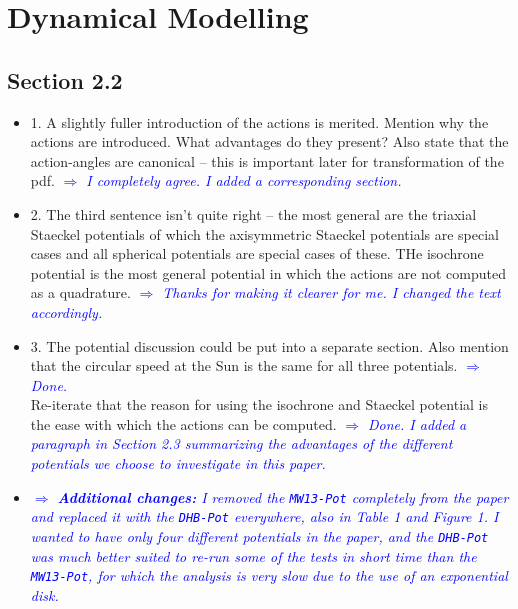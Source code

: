 \documentclass[10pt,a4paper]{article}
\newcommand{\Comment}[1]{\textsl{\textcolor{Blue}{$\Longrightarrow$ {#1}}}}
\begin{document}
\section{Dynamical Modelling}

\subsection{Section 2.2}
\begin{itemize}
\item 1. A slightly fuller introduction of the actions is merited. Mention why the actions are introduced. What advantages do they present? Also state that the action-angles are canonical -- this is important later for transformation of the pdf. \Comment{I completely agree. I added a corresponding section.}
\item 2. The third sentence isn't quite right -- the most general are the triaxial Staeckel potentials of which the axisymmetric Staeckel potentials are special cases and all spherical potentials are special cases of these. THe isochrone potential is the most general potential in which the actions are not computed as a quadrature. \Comment{Thanks for making it clearer for me. I changed the text accordingly.}
\item 3. The potential discussion could be put into a separate section. Also mention that the circular speed at the Sun is the same for all three potentials. \Comment{Done.} \\
Re-iterate that the reason for using the isochrone and Staeckel potential is the ease with which the actions can be computed. \Comment{Done. I added a paragraph in Section 2.3 summarizing the advantages of the different potentials we choose to investigate in this paper.}
\item \Comment{\textbf{Additional changes:} I removed the \texttt{MW13-Pot} completely from the paper and replaced it with the \texttt{DHB-Pot} everywhere, also in Table 1 and Figure 1. I wanted to have only four different potentials in the paper, and the \texttt{DHB-Pot} was much better suited to re-run some of the tests in short time than the \texttt{MW13-Pot}, for which the analysis is very slow due to the use of an exponential disk.}
\end{itemize}
\end{document}
